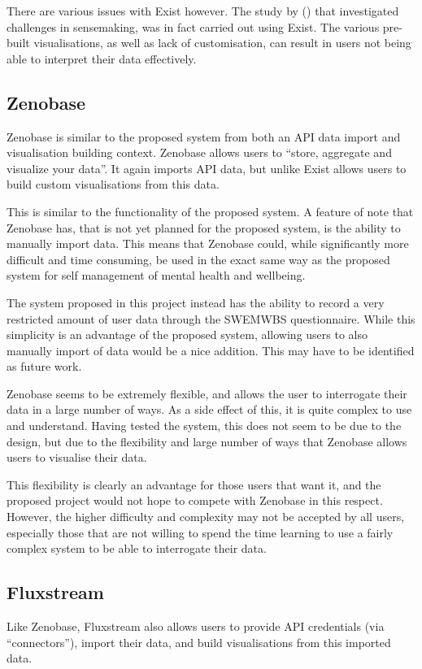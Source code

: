 \documentclass[11pt,openright,a4paper]{report}
\begin{document}
There are various issues with Exist however. The study by \citeauthor{jones2016sensemaking} (\citeyear{jones2016sensemaking}) that investigated challenges in sensemaking, was in fact carried out using Exist. The various pre-built visualisations, as well as lack of customisation, can result in users not being able to interpret their data effectively.

\subsection{Zenobase}
Zenobase \parencite{zenobase} is similar to the proposed system from both an API data import and visualisation building context. Zenobase allows users to \enquote{store, aggregate and visualize your data}. It again imports API data, but unlike Exist allows users to build custom visualisations from this data.

This is similar to the functionality of the proposed system. A feature of note that Zenobase has, that is not yet planned for the proposed system, is the ability to manually import data. This means that Zenobase could, while significantly more difficult and time consuming, be used in the exact same way as the proposed system for self management of mental health and wellbeing.

The system proposed in this project instead has the ability to record a very restricted amount of user data through the SWEMWBS questionnaire. While this simplicity is an advantage of the proposed system, allowing users to also manually import of data would be a nice addition. This may have to be identified as future work.

Zenobase seems to be extremely flexible, and allows the user to interrogate their data in a large number of ways. As a side effect of this, it is quite complex to use and understand. Having tested the system, this does not seem to be due to the design, but due to the flexibility and large number of ways that Zenobase allows users to visualise their data.

This flexibility is clearly an advantage for those users that want it, and the proposed project would not hope to compete with Zenobase in this respect. However, the higher difficulty and complexity may not be accepted by all users, especially those that are not willing to spend the time learning to use a fairly complex system to be able to interrogate their data.

\subsection{Fluxstream}
Like Zenobase, Fluxstream \parencite{fluxstream} also allows users to provide API credentials (via \enquote{connectors}), import their data, and build visualisations from this imported data.
\end{document}
